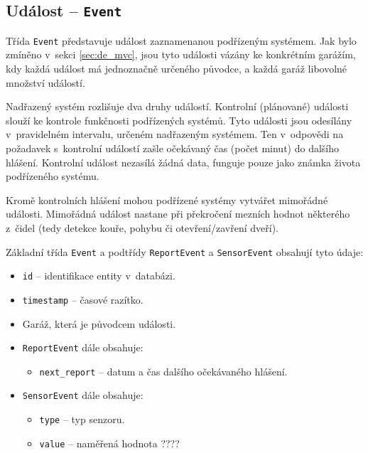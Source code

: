 
\subsection{Událost -- \texttt{Event}}

Třída \texttt{Event} představuje událost zaznamenanou podřízeným systémem. Jak bylo zmíněno v~sekci \ref{sec:de_mvc}, jsou tyto události vázány ke konkrétním garážím, kdy každá událost má jednoznačně určeného původce, a každá garáž libovolné množství událostí.

Nadřazený systém rozlišuje dva druhy událostí. Kontrolní (plánované) události slouží ke kontrole funkčnosti podřízených systémů. Tyto události jsou odesílány v~pravidelném intervalu, určeném nadřazeným systémem. Ten v~odpovědi na požadavek s~kontrolní událostí zašle očekávaný čas (počet minut) do dalšího hlášení. Kontrolní událost nezasílá žádná data, funguje pouze jako známka života podřízeného systému.

Kromě kontrolních hlášení mohou podřízené systémy vytvářet mimořádné události. Mimořádná událost nastane při překročení mezních hodnot některého z~čidel (tedy detekce kouře, pohybu či otevření/zavření dveří).

Základní třída \texttt{Event} a podtřídy \texttt{ReportEvent} a \texttt{SensorEvent} obsahují tyto údaje:

\begin{itemize}
    \item \texttt{id} -- identifikace entity v~databázi.
    \item \texttt{timestamp} -- časové razítko.
    \item Garáž, která je původcem události.
    \item \texttt{ReportEvent} dále obsahuje:
        \begin{itemize}
            \item \texttt{next\_report} -- datum a čas dalšího očekávaného hlášení.
        \end{itemize}
    \item \texttt{SensorEvent} dále obsahuje:
        \begin{itemize}
            \item \texttt{type} -- typ senzoru.
            \item \texttt{value} -- naměřená hodnota ????
        \end{itemize}
\end{itemize}

